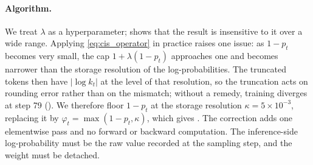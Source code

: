 \paragraph{Algorithm.}
We treat $\lambda$ as a hyperparameter;  shows
that the result is insensitive to it over a wide range. Applying
\eqref{eq:cis_operator} in practice raises one issue: as $1-p_t$ becomes very
small, the cap $1+\lambda(1-p_t)$ approaches one and becomes narrower than the
storage resolution of the log-probabilities. The truncated tokens then have
$|\log k_t|$ at the level of that resolution, so the truncation acts on
rounding error rather than on the mismatch; without a remedy, training diverges
at step 79 (). We therefore floor $1-p_t$ at the storage
resolution $\kappa=5\times10^{-3}$, replacing it by
$\varphi_t=\max(1-p_t,\kappa)$, which gives . The correction adds
one elementwise pass and no forward or backward computation. The
inference-side log-probability must be the raw value recorded at the sampling
step, and the weight must be detached.

